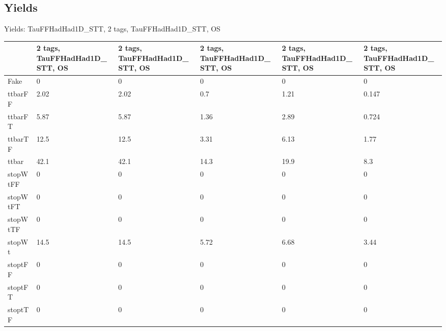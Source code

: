 
\subsection{Yields}

\begin{frame}{Yields: TauFFHadHad1D\_STT, 2 tags, TauFFHadHad1D\_STT, OS}
\begin{center}
  \begin{tabular}{l| >{\centering\let\newline\\\arraybackslash\hspace{0pt}}m{1.4cm}| >{\centering\let\newline\\\arraybackslash\hspace{0pt}}m{1.4cm}| >{\centering\let\newline\\\arraybackslash\hspace{0pt}}m{1.4cm}| >{\centering\let\newline\\\arraybackslash\hspace{0pt}}m{1.4cm}| >{\centering\let\newline\\\arraybackslash\hspace{0pt}}m{1.4cm}}
    & 2 tags, TauFFHadHad1D\_STT, OS & 2 tags, TauFFHadHad1D\_STT, OS & 2 tags, TauFFHadHad1D\_STT, OS & 2 tags, TauFFHadHad1D\_STT, OS & 2 tags, TauFFHadHad1D\_STT, OS \\
 \hline \hline
    Fake& 0 & 0 & 0 & 0 & 0 \\
 \hline
    ttbarFF& 2.02 & 2.02 & 0.7 & 1.21 & 0.147 \\
 \hline
    ttbarFT& 5.87 & 5.87 & 1.36 & 2.89 & 0.724 \\
 \hline
    ttbarTF& 12.5 & 12.5 & 3.31 & 6.13 & 1.77 \\
 \hline
    ttbar& 42.1 & 42.1 & 14.3 & 19.9 & 8.3 \\
 \hline
    stopWtFF& 0 & 0 & 0 & 0 & 0 \\
 \hline
    stopWtFT& 0 & 0 & 0 & 0 & 0 \\
 \hline
    stopWtTF& 0 & 0 & 0 & 0 & 0 \\
 \hline
    stopWt& 14.5 & 14.5 & 5.72 & 6.68 & 3.44 \\
 \hline
    stoptFF& 0 & 0 & 0 & 0 & 0 \\
 \hline
    stoptFT& 0 & 0 & 0 & 0 & 0 \\
 \hline
    stoptTF& 0 & 0 & 0 & 0 & 0 \\

\end{tabular}
\end{center}
\end{frame}
